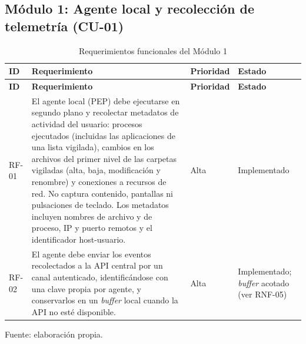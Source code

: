 \subsection{Módulo 1: Agente local y recolección de telemetría (CU-01)}
\begin{tablacompacta}
\begin{longtable}{P{1.1cm}P{9.3cm}C{1.6cm}P{2.6cm}}
	\caption{Requerimientos funcionales del Módulo 1}
	\label{tab:rf-modulo1}\\
	\hline
	\textbf{ID} & \textbf{Requerimiento} & \textbf{Prioridad} & \textbf{Estado} \\
	\hline
	\endfirsthead
	\hline
	\textbf{ID} & \textbf{Requerimiento} & \textbf{Prioridad} & \textbf{Estado} \\
	\hline
	\endhead
	RF-01 & El agente local (PEP) debe ejecutarse en segundo plano y recolectar metadatos de actividad del usuario: procesos ejecutados (incluidas las aplicaciones de una lista vigilada), cambios en los archivos del primer nivel de las carpetas vigiladas (alta, baja, modificación y renombre) y conexiones a recursos de red. No captura contenido, pantallas ni pulsaciones de teclado. Los metadatos incluyen nombres de archivo y de proceso, IP y puerto remotos y el identificador host-usuario. & Alta & Implementado \\
	\hline
	RF-02 & El agente debe enviar los eventos recolectados a la API central por un canal autenticado, identificándose con una clave propia por agente, y conservarlos en un \emph{buffer} local cuando la API no esté disponible. & Alta & Implementado; \emph{buffer} acotado (ver RNF-05) \\
	\hline
\end{longtable}
{\small Fuente: elaboración propia.\par}
\end{tablacompacta}

